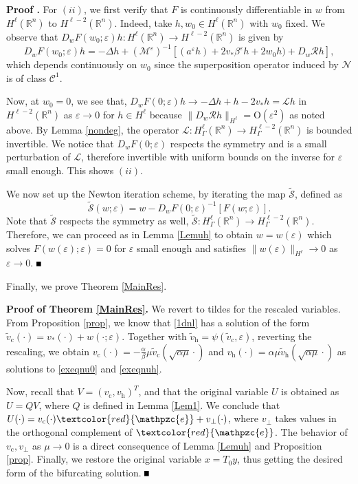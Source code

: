 \documentclass[10pt]{article}
\newenvironment{Proof}[1][\unskip]%
 {\begin{trivlist} \item[]{\bf Proof #1. }}%
 {\hspace*{\fill}$\rule{.4\baselineskip}{.4\baselineskip}$\end{trivlist}}
\newcommand{\R}{\mathbb{R}}
\newcommand{\rmO}{\mathrm{O}}
\newcommand{\eps}{\varepsilon}
\newcommand{\Nl}{\mathcal{N}}
\newcommand{\cS}{\mathcal{S}}
\newcommand{\cL}{\mathcal{L}}
\newcommand{\e}{\mathpzc{e}}
\newcommand{\M}{\mathcal{M}}
\newcommand{\Rm}{\mathcal{R}}
\begin{document}
\begin{Proof}
For $(ii)$, we first verify that $F$ is continuously differentiable in $w$ from $H^\ell (\R^n)$ to $H^{\ell-2}(\R^n)$. Indeed, take $h, w_0\in H^\ell(\R^n)$ with $w_0$ fixed. We observe that $D_wF(w_0;\eps)h:H^\ell (\R^n) \to H^{\ell-2}(\R^n)$ is given by
\[
D_wF(w_0;\eps)h = -\Delta h+(\M^\eps)^{-1}\left[(a^\eps h)+2v_*\beta^\eps h + 2w_0h)+D_w\Rm h\right],
\]
which depends continuously on $w_0$ since the superposition operator induced by $\Nl$ is of class $\mathscr{C}^1$.

Now, at $w_0 = 0$, we see that, $D_wF(0;\eps)h \to -\Delta h+h-2v_*h = \cL h$ in $H^{\ell-2}(\R^n)$ as $\eps \to 0$ for $h \in H^\ell$ because $\|D_w\Rm h\|_{H^\ell} = \rmO(\eps^2)$ as noted above. By Lemma \ref{nondeg}, the operator $\cL : H^\ell_{\Gamma}(\R^n) \to H^{\ell-2}_{\Gamma}(\R^n)$ is bounded invertible. We notice that $D_wF(0;\eps)$ respects the symmetry and is a small perturbation of $\cL$, therefore invertible with uniform bounds on the inverse for $\eps$ small enough. This shows $(ii)$.

We now set up the Newton iteration scheme, by iterating the map  $\tilde{\cS}$, defined as
\[
\tilde{\cS}(w;\eps) = w-D_wF(0;\eps)^{-1}[F(w;\eps)]
.\]
Note that $\tilde{\cS}$ respects the symmetry as well, $\tilde{\cS} : H^\ell_\Gamma(\R^n) \to H^{\ell-2}_\Gamma(\R^n)$. Therefore, we can proceed as in Lemma \ref{Lemuh} to obtain $w=w(\eps)$ which solves $F(w(\eps);\eps) = 0$ for $\eps $ small enough and satisfies $\|w(\eps)\|_{H^\ell} \to 0$ as $\eps \to 0$.
\end{Proof}

Finally, we prove Theorem \ref{MainRes}.
\begin{Proof}[of Theorem \ref{MainRes}] We revert to tildes for the rescaled variables. From Proposition \ref{prop}, we know that \eqref{1dnl} has a solution of the form $\tilde{v}_\mathrm{c}(\cdot) = v_*(\cdot)+w(\cdot;\eps)$. Together with $\tilde{v}_\mathrm{h} = \psi(\tilde{v}_\mathrm{c},\eps)$, reverting the rescaling, we obtain $v_\mathrm{c}(\cdot) = -\frac{\alpha}{\beta}\mu \tilde{v}_\mathrm{c}(\sqrt{\alpha\mu }\cdot)$ and $v_\mathrm{h}(\cdot) = \alpha\mu \tilde{v}_\mathrm{h}(\sqrt{\alpha\mu}\cdot)$ as solutions to \eqref{exeqnu0} and \eqref{exeqnuh}.

Now, recall that $V=(v_\mathrm{c},v_\mathrm{h})^T$, and that the original variable $U$ is obtained as $U= QV$, where $Q$ is defined in Lemma \ref{Lem1}. We conclude that $U(\cdot)=v_\mathrm{c}(\cdot)\textcolor{red}{\e}+v_{\perp}(\cdot)$, where $v_{\perp}$ takes values in the orthogonal complement of $\textcolor{red}{\e}$. The behavior of $v_\mathrm{c},v_{\perp}$ as $\mu \to 0$ is a direct consequence of Lemma \ref{Lemuh} and Proposition \ref{prop}. Finally, we restore the original variable $x = T_0y$, thus getting the desired form of the bifurcating solution.
\end{Proof}
\end{document}
